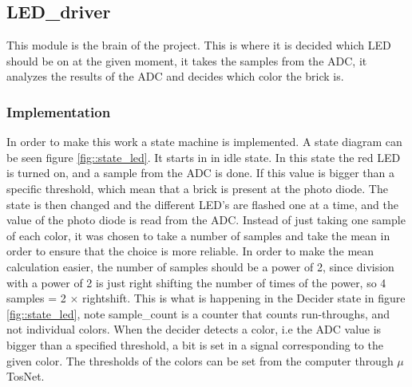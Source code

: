 \subsection{LED\_driver}
This module is the brain of the project. This is where it is decided which LED should be on at the given moment, it takes the samples from the ADC, it analyzes the results of the ADC and decides which color the brick is.

\subsubsection{Implementation}
In order to make this work a state machine is implemented. A state diagram can be seen figure \ref{fig::state_led}. It starts in in idle state. In this state the red LED is turned on, and a sample from the ADC is done. If this value is bigger than a specific threshold, which mean that a brick is present at the photo diode. The state is then changed and the different LED's are flashed one at a time, and the value of the photo diode is read from the ADC. Instead of just taking one sample of each color, it was chosen to take a number of samples and take the mean in order to ensure that the choice is more reliable. In order to make the mean calculation easier, the number of samples should be a power of 2, since division with a power of 2 is just right shifting the number of times of the power, so 4 samples = 2 $\times$ rightshift. This is what is happening in the Decider state in figure \ref{fig::state_led}, note sample\_count is a counter that counts run-throughs, and not individual colors. When the decider detects a color, i.e the ADC value is bigger than a specified threshold, a bit is set in a signal corresponding to the given color. The thresholds of the colors can be set from the computer through $\mu$TosNet. 

